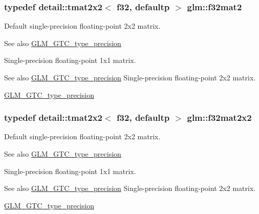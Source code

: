 \subsubsection[{\texorpdfstring{f32mat2}{f32mat2}}]{\setlength{\rightskip}{0pt plus 5cm}typedef detail\+::tmat2x2$<$ f32, defaultp $>$ {\bf glm\+::f32mat2}}\hypertarget{group__gtc__type__precision_ga5a8b82f5ef3eb6355640d57466793d9b}{}\label{group__gtc__type__precision_ga5a8b82f5ef3eb6355640d57466793d9b}
Default single-\/precision floating-\/point 2x2 matrix. \begin{DoxySeeAlso}{See also}
\hyperlink{group__gtc__type__precision}{G\+L\+M\+\_\+\+G\+T\+C\+\_\+type\+\_\+precision}
\end{DoxySeeAlso}
Single-\/precision floating-\/point 1x1 matrix. \begin{DoxySeeAlso}{See also}
\hyperlink{group__gtc__type__precision}{G\+L\+M\+\_\+\+G\+T\+C\+\_\+type\+\_\+precision} Single-\/precision floating-\/point 2x2 matrix. 

\hyperlink{group__gtc__type__precision}{G\+L\+M\+\_\+\+G\+T\+C\+\_\+type\+\_\+precision} 
\end{DoxySeeAlso}
\subsubsection[{\texorpdfstring{f32mat2x2}{f32mat2x2}}]{\setlength{\rightskip}{0pt plus 5cm}typedef detail\+::tmat2x2$<$ f32, defaultp $>$ {\bf glm\+::f32mat2x2}}\hypertarget{group__gtc__type__precision_ga4eb16d89ecff72fa77f10c9a1e7ca475}{}\label{group__gtc__type__precision_ga4eb16d89ecff72fa77f10c9a1e7ca475}
Default single-\/precision floating-\/point 2x2 matrix. \begin{DoxySeeAlso}{See also}
\hyperlink{group__gtc__type__precision}{G\+L\+M\+\_\+\+G\+T\+C\+\_\+type\+\_\+precision}
\end{DoxySeeAlso}
Single-\/precision floating-\/point 1x1 matrix. \begin{DoxySeeAlso}{See also}
\hyperlink{group__gtc__type__precision}{G\+L\+M\+\_\+\+G\+T\+C\+\_\+type\+\_\+precision} Single-\/precision floating-\/point 2x2 matrix. 

\hyperlink{group__gtc__type__precision}{G\+L\+M\+\_\+\+G\+T\+C\+\_\+type\+\_\+precision} 
\end{DoxySeeAlso}
